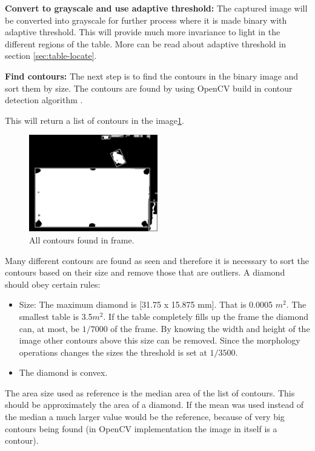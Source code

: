 \textbf{Convert to grayscale and use adaptive threshold:}
The captured image will be converted into grayscale for further process where it is made binary with adaptive threshold. This will provide much more invariance to light in the different regions of the table. More can be read about adaptive threshold in section \ref{sec:table-locate}.


\textbf{Find contours:}
The next step is to find the contours in the binary image and sort them by size. The contours are found by using OpenCV build in contour detection algorithm \cite{contour}.

This will return a list of contours in the image\ref{fig:allcontours}.

\begin{figure}[htpb]
\begin{center}
\leavevmode
\includegraphics[width=0.5\textwidth]{images/allcontours.png}
\end{center}
\caption{All contours found in frame.}
\label{fig:allcontours}
\end{figure}

Many different contours are found as seen and therefore it is necessary to sort the contours based on their size and remove those that are outliers. A diamond should obey certain rules:

\begin{itemize}
	\item Size: The maximum diamond is [31.75 x 15.875 mm]. That is 0.0005 $m^2$. The smallest table is 3.5$m^2$. If the table completely fills up the frame the diamond can, at most, be $1/7000$ of the frame. By knowing the width and height of the image other contours above this size can be removed. Since the morphology operations changes the sizes the threshold is set at $1/3500$.
	\item The diamond is convex.
\end{itemize}

The area size used as reference is the median area of the list of contours. This should be approximately the area of a diamond. If the mean was used instead of the median a much larger value would be the reference, because of very big contours being found (in OpenCV implementation the image in itself is a contour).

